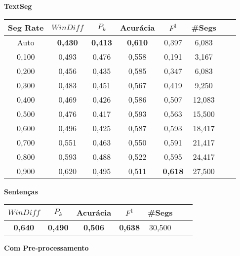 \documentclass{article}
\begin{document}

 {  
\large
\center
	\textbf{TextSeg}  

}

\begin{longtable}[c]{|c|c|c|c|c|c|c|c|} 
\hline 
 Seg Rate & $WinDiff$ & $P_k$ & Acurácia & $F^1$ & \#Segs\\ \hline 
 Auto & \cellcolor{gray!20} \textbf{0,430} & \cellcolor{gray!20} \textbf{0,413} & \cellcolor{gray!20} \textbf{0,610} & 0,397 & 6,083  \\ \hline 
 0,100 & 0,493 & 0,476 & 0,558 & 0,191 & 3,167  \\ \hline 
 0,200 & 0,456 & 0,435 & 0,585 & 0,347 & 6,083  \\ \hline 
 0,300 & 0,483 & 0,451 & 0,567 & 0,419 & 9,250  \\ \hline 
 0,400 & 0,469 & 0,426 & 0,586 & 0,507 & 12,083  \\ \hline 
 0,500 & 0,476 & 0,417 & 0,593 & 0,563 & 15,500  \\ \hline 
 0,600 & 0,496 & 0,425 & 0,587 & 0,593 & 18,417  \\ \hline 
 0,700 & 0,551 & 0,463 & 0,550 & 0,591 & 21,417  \\ \hline 
 0,800 & 0,593 & 0,488 & 0,522 & 0,595 & 24,417  \\ \hline 
 0,900 & 0,620 & 0,495 & 0,511 & \cellcolor{gray!20} \textbf{0,618} & 27,500  \\ \hline 
 \end{longtable} 







{  
\large
\center
	\textbf{Sentenças}  

}

\begin{longtable}[c]{|c|c|c|c|c|c|c|} 
\hline 
 $WinDiff$ & $P_k$ & Acurácia & $F^1$ & \#Segs\\ \hline 
 \cellcolor{gray!20} \textbf{0,640} & \cellcolor{gray!20} \textbf{0,490} & \cellcolor{gray!20} \textbf{0,506} & \cellcolor{gray!20} \textbf{0,638} & 30,500  \\ \hline 
 \end{longtable} 




\newpage



{  
\Large
\center
	\textbf{Com Pre-processamento}  

}
\end{document}
